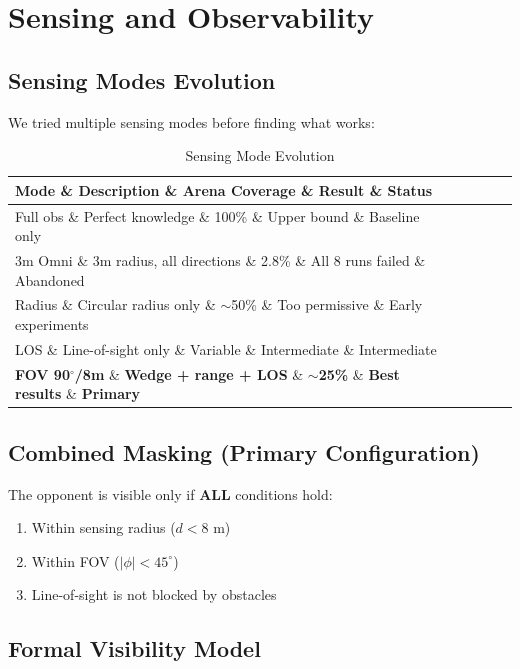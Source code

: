 \documentclass[11pt,a4paper]{report}
\begin{document}
\section{Sensing and Observability}

\subsection{Sensing Modes Evolution}
We tried multiple sensing modes before finding what works:

\begin{table}[h]
\centering
\caption{Sensing Mode Evolution}
\label{tab:sensing-evolution}
\begin{tabular}{@{}lllll@{}}
\toprule
\textbf{Mode} \& \textbf{Description} \& \textbf{Arena Coverage} \& \textbf{Result} \& \textbf{Status} \\
\midrule
Full obs \& Perfect knowledge \& 100\% \& Upper bound \& Baseline only \\
3m Omni \& 3m radius, all directions \& 2.8\% \& All 8 runs failed \& Abandoned \\
Radius \& Circular radius only \& $\sim$50\% \& Too permissive \& Early experiments \\
LOS \& Line-of-sight only \& Variable \& Intermediate \& Intermediate \\
\textbf{FOV 90$^\circ$/8m} \& \textbf{Wedge + range + LOS} \& \textbf{$\sim$25\%} \& \textbf{Best results} \& \textbf{Primary} \\
\bottomrule
\end{tabular}
\end{table}

\subsection{Combined Masking (Primary Configuration)}
The opponent is visible only if \textbf{ALL} conditions hold:
\begin{enumerate}
    \item Within sensing radius ($d < 8$ m)
    \item Within FOV ($|\phi| < 45^\circ$)
    \item Line-of-sight is not blocked by obstacles
\end{enumerate}

\subsection{Formal Visibility Model}
\label{sec:visibility}
\end{document}
